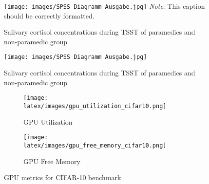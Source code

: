 \begin{figure}[H]
    \caption{Salivary cortisol concentrations during \ac{TSST} of paramedics and non-paramedic group}\label{fig:cortisol.concentraition}
    \texttt{[image: images/SPSS Diagramm Ausgabe.jpg]}
    \small\textit{Note}. This caption should be correctly formatted.
\end{figure}

\begin{figure}[H]
    \texttt{[image: images/SPSS Diagramm Ausgabe.jpg]}
    \caption{Salivary cortisol concentrations during \ac{TSST} of paramedics and non-paramedic group}\label{fig:cortisol.concentraition}
\end{figure}

\begin{figure}[H]
    {\centering
        \begin{subfigure}{0.45\textwidth}
            \texttt{[image: latex/images/gpu\_utilization\_cifar10.png]}
            \caption{GPU Utilization}\label{fig:gpuUtilization}
        \end{subfigure}
        \hfill
        \begin{subfigure}{0.45\textwidth}
            \texttt{[image: latex/images/gpu\_free\_memory\_cifar10.png]}
            \caption{GPU Free Memory}\label{fig:gpuFreeMemory}
        \end{subfigure}
    }
    \caption{GPU metrics for \acs{CIFAR}-10 benchmark}\label{fig:cifar10Gpu}
\end{figure}

